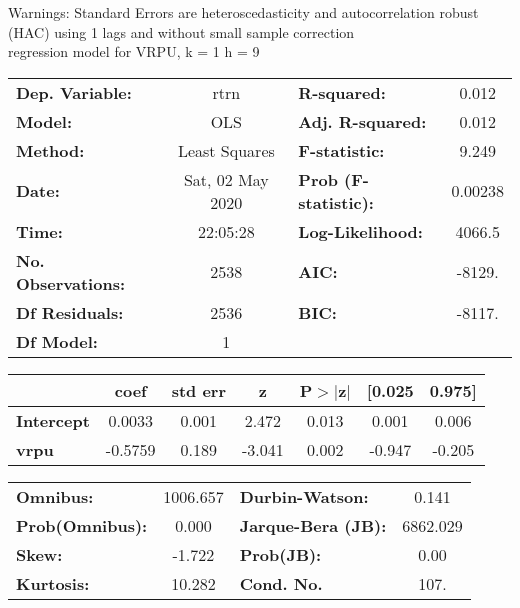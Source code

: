 Warnings: \newline
 [1] Standard Errors are heteroscedasticity and autocorrelation robust (HAC) using 1 lags and without small sample correction\\ 

regression model for VRPU, k = 1 h = 9\begin{center}
\begin{tabular}{lclc}
\toprule
\textbf{Dep. Variable:}    &       rtrn       & \textbf{  R-squared:         } &     0.012   \\
\textbf{Model:}            &       OLS        & \textbf{  Adj. R-squared:    } &     0.012   \\
\textbf{Method:}           &  Least Squares   & \textbf{  F-statistic:       } &     9.249   \\
\textbf{Date:}             & Sat, 02 May 2020 & \textbf{  Prob (F-statistic):} &  0.00238    \\
\textbf{Time:}             &     22:05:28     & \textbf{  Log-Likelihood:    } &    4066.5   \\
\textbf{No. Observations:} &        2538      & \textbf{  AIC:               } &    -8129.   \\
\textbf{Df Residuals:}     &        2536      & \textbf{  BIC:               } &    -8117.   \\
\textbf{Df Model:}         &           1      & \textbf{                     } &             \\
\bottomrule
\end{tabular}
\begin{tabular}{lcccccc}
                   & \textbf{coef} & \textbf{std err} & \textbf{z} & \textbf{P$> |$z$|$} & \textbf{[0.025} & \textbf{0.975]}  \\
\midrule
\textbf{Intercept} &       0.0033  &        0.001     &     2.472  &         0.013        &        0.001    &        0.006     \\
\textbf{vrpu}      &      -0.5759  &        0.189     &    -3.041  &         0.002        &       -0.947    &       -0.205     \\
\bottomrule
\end{tabular}
\begin{tabular}{lclc}
\textbf{Omnibus:}       & 1006.657 & \textbf{  Durbin-Watson:     } &    0.141  \\
\textbf{Prob(Omnibus):} &   0.000  & \textbf{  Jarque-Bera (JB):  } & 6862.029  \\
\textbf{Skew:}          &  -1.722  & \textbf{  Prob(JB):          } &     0.00  \\
\textbf{Kurtosis:}      &  10.282  & \textbf{  Cond. No.          } &     107.  \\
\bottomrule
\end{tabular}
\end{center}

